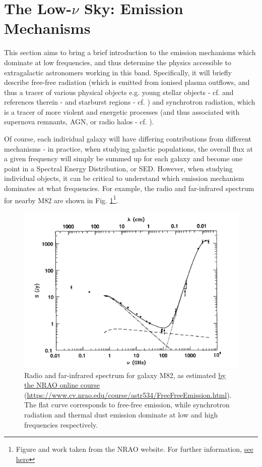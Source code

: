 
\section{The Low-$\nu$ Sky: Emission Mechanisms}
\pg
This section aims to bring a brief introduction to the emission mechanisms which dominate at low frequencies, and thus determine the physics accessible to extragalactic astronomers working in this band. Specifically, it will briefly describe
free-free radiation (which is emitted from ionised plasma outflows, and thus a tracer of various physical objects e.g. young stellar objects - cf. \citet{2017ApJ...834..206C} and references therein - and starburst regions - cf. \citet{2015A&A...574A.114V}) and synchrotron radiation, which is a tracer of more violent and energetic processes (and thus associated with supernova remnants, AGN, or radio halos - cf. \citet{2010A&A...509A..68C}).

\pg
Of course, each individual galaxy will have differing contributions from different mechanisms - in practice, when studying galactic populations, the overall flux at a given frequency will simply be summed up for each galaxy and become one point in a Spectral Energy Distribution, or SED. However, when studying individual objects, it can be critical to understand which emission mechanism dominates at what frequencies. For example, the radio and far-infrared spectrum for nearby M82 are shown in Fig. \ref{plot.m82.spectrum}\footnote{Figure and work taken from the NRAO website. For further information, \href{https://www.cv.nrao.edu/course/astr534/FreeFreeEmission.html}{see here}}.
\begin{figure}[!h]
\centering
\includegraphics[width=\textwidth]{images/M82Spectrum.png}
\caption{\label{plot.m82.spectrum} Radio and far-infrared spectrum for galaxy M82, as estimated \href{https://www.cv.nrao.edu/course/astr534/FreeFreeEmission.html}{by the NRAO online course} (\url{https://www.cv.nrao.edu/course/astr534/FreeFreeEmission.html}). The flat curve corresponds to free-free emission, while synchrotron radiation and thermal dust emission dominate at low and high frequencies respectively.}
\end{figure}


